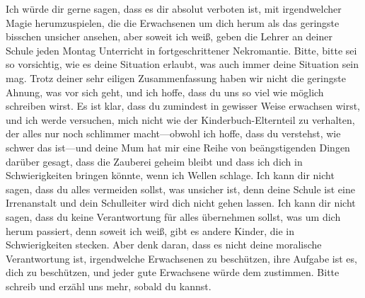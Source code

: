 \begin{writtenNote}
Ich würde dir gerne sagen, dass es dir absolut verboten ist, mit irgendwelcher Magie herumzuspielen, die die Erwachsenen um dich herum als das geringste bisschen unsicher ansehen, aber soweit ich weiß, geben die Lehrer an deiner Schule jeden Montag Unterricht in fortgeschrittener Nekromantie. Bitte, bitte sei so vorsichtig, wie es deine Situation erlaubt, was auch immer deine Situation sein mag. Trotz deiner sehr eiligen Zusammenfassung haben wir nicht die geringste Ahnung, was vor sich geht, und ich hoffe, dass du uns so viel wie möglich schreiben wirst. Es ist klar, dass du zumindest in gewisser Weise erwachsen wirst, und ich werde versuchen, mich nicht wie der Kinderbuch-Elternteil zu verhalten, der alles nur noch schlimmer macht—obwohl ich hoffe, dass du verstehst, wie schwer das ist—und deine Mum hat mir eine Reihe von beängstigenden Dingen darüber gesagt, dass die Zauberei geheim bleibt und dass ich dich in Schwierigkeiten bringen könnte, wenn ich Wellen schlage.
Ich kann dir nicht sagen, dass du alles vermeiden sollst, was unsicher ist, denn deine Schule ist eine Irrenanstalt und dein Schulleiter wird dich nicht gehen lassen. Ich kann dir nicht sagen, dass du keine Verantwortung für alles übernehmen sollst, was um dich herum passiert, denn soweit ich weiß, gibt es andere Kinder, die in Schwierigkeiten stecken. Aber denk daran, dass es nicht deine moralische Verantwortung ist, irgendwelche Erwachsenen zu beschützen, ihre Aufgabe ist es, dich zu beschützen, und jeder gute Erwachsene würde dem zustimmen. Bitte schreib und erzähl uns mehr, sobald du kannst.


\end{writtenNote}
